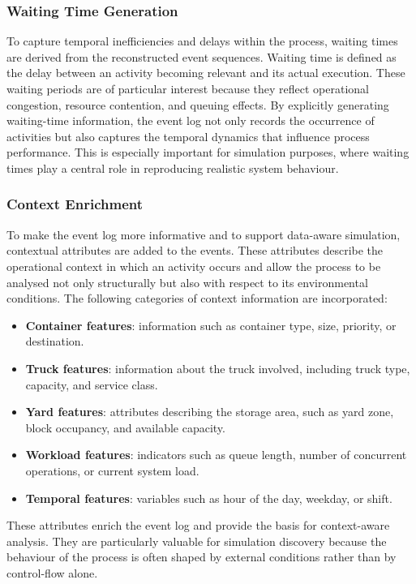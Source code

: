 \subsubsection{Waiting Time Generation}

To capture temporal inefficiencies and delays within the process, waiting times are derived from the reconstructed event sequences. Waiting time is defined as the delay between an activity becoming relevant and its actual execution. These waiting periods are of particular interest because they reflect operational congestion, resource contention, and queuing effects. By explicitly generating waiting-time information, the event log not only records the occurrence of activities but also captures the temporal dynamics that influence process performance. This is especially important for simulation purposes, where waiting times play a central role in reproducing realistic system behaviour.

\subsubsection{Context Enrichment}

To make the event log more informative and to support data-aware simulation, contextual attributes are added to the events. These attributes describe the operational context in which an activity occurs and allow the process to be analysed not only structurally but also with respect to its environmental conditions. The following categories of context information are incorporated:

\begin{itemize}
    \item \textbf{Container features}: information such as container type, size, priority, or destination.
    \item \textbf{Truck features}: information about the truck involved, including truck type, capacity, and service class.
    \item \textbf{Yard features}: attributes describing the storage area, such as yard zone, block occupancy, and available capacity.
    \item \textbf{Workload features}: indicators such as queue length, number of concurrent operations, or current system load.
    \item \textbf{Temporal features}: variables such as hour of the day, weekday, or shift.
\end{itemize}

These attributes enrich the event log and provide the basis for context-aware analysis. They are particularly valuable for simulation discovery because the behaviour of the process is often shaped by external conditions rather than by control-flow alone.


